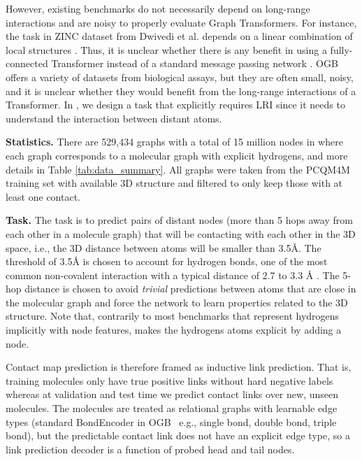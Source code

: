 \documentclass{article}
\begin{document}
However, existing benchmarks do not necessarily depend on long-range interactions and are noisy to properly evaluate Graph Transformers. For instance, the task in ZINC dataset from Dwivedi et al. \cite{dwivedi2020benchmarking} 
depends on a linear combination of local structures \cite{jin_junction_2018}. Thus, it is unclear whether there is any benefit in using a fully-connected Transformer instead of a standard message passing network \cite{rampasek2022GPS}. OGB \cite{hu2020open} offers a variety of datasets from biological assays, but they are often small, noisy, and it is unclear whether they would benefit from the long-range interactions of a Transformer. In \pcqmcontact, we design a task that explicitly requires LRI since it needs to understand the interaction between distant atoms.

\textbf{Statistics.} There are 529,434 graphs with a total of 15 million nodes in \pcqmcontact where each graph corresponds to a molecular graph with explicit hydrogens, and more details in Table \ref{tab:data_summary}. All graphs were taken from the PCQM4M training set with available 3D structure \cite{hu2021ogb_lsc} and filtered to only keep those with at least one contact.



\textbf{Task.} 
The task is to predict pairs of distant nodes (more than 5 hops away from each other in a molecule graph) that will be contacting with each other in the 3D space, i.e., the 3D distance between atoms will be smaller than 3.5{\AA}. The threshold of 3.5{\AA} is chosen to account for hydrogen bonds, one of the most common non-covalent interaction with a typical distance of 2.7 to 3.3 {\AA}
\cite{MCREE199991}. The 5-hop distance is chosen to avoid \textit{trivial} predictions between atoms that are close in the molecular graph and force the network to learn properties related to the 3D structure. Note that, contrarily to most benchmarks that represent hydrogens implicitly with node features, \pcqmcontact makes the hydrogens atoms explicit by adding a node.



Contact map prediction is therefore framed as inductive link prediction. 
That is, training molecules only have true positive links without hard negative labels whereas at validation and test time we predict contact links over new, unseen molecules.
The molecules are treated as relational graphs with learnable edge types (standard BondEncoder in OGB~\cite{hu2021ogb_lsc} e.g., single bond, double bond, triple bond), but the predictable contact link does not have an explicit edge type, so a link prediction decoder is a function  of probed head and tail nodes.
\end{document}
